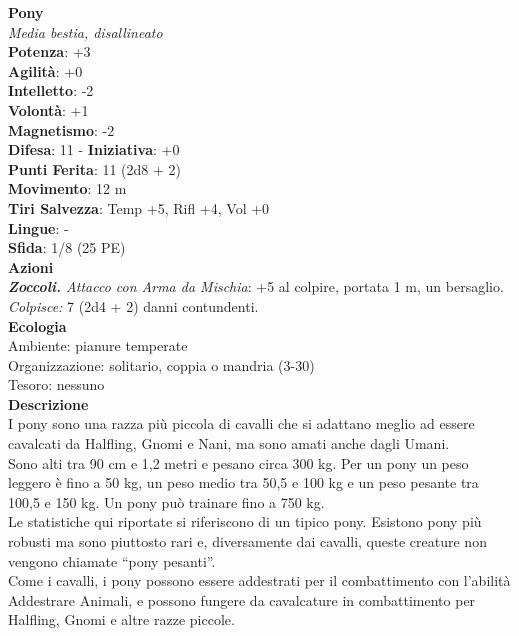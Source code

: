 \begin{multicols}{2}
\medskip\textbf{Pony}\\
\emph{Media bestia, disallineato}\\
\textbf{Potenza}: +3\\
\textbf{Agilità}: +0\\
\textbf{Intelletto}: -2\\
\textbf{Volontà}: +1\\
\textbf{Magnetismo}: -2\\
\textbf{Difesa}: 11 - \textbf{Iniziativa}: +0\\
\textbf{Punti Ferita}: 11 (2d8 + 2)\\
\textbf{Movimento}: 12 m\\
\textbf{Tiri Salvezza}: Temp +5, Rifl +4, Vol +0 \\
\textbf{Lingue}: -\\
\textbf{Sfida}: 1/8 (25 PE)\smallskip\\
\smallskip\textbf{Azioni}\\
\emph{\textbf{Zoccoli.} Attacco con Arma da Mischia}: +5 al colpire, portata 1 m, un bersaglio.\\
\emph{Colpisce:} 7 (2d4 + 2) danni contundenti.\\
\textbf{Ecologia}\\
Ambiente: pianure temperate\\
Organizzazione: solitario, coppia o mandria (3-30)\\
Tesoro: nessuno\\
\textbf{Descrizione}\\

I pony sono una razza più piccola di cavalli che si adattano meglio ad essere cavalcati da Halfling, Gnomi e Nani, ma sono amati anche dagli Umani.\\

Sono alti tra 90 cm e 1,2 metri e pesano circa 300 kg. Per un pony un peso leggero è fino a 50 kg, un peso medio tra 50,5 e 100 kg e un peso pesante tra 100,5 e 150 kg. Un pony può trainare fino a 750 kg.\\

Le statistiche qui riportate si riferiscono di un tipico pony. Esistono pony più robusti  ma sono piuttosto rari e, diversamente dai cavalli, queste creature non vengono chiamate “pony pesanti”.\\

Come i cavalli, i pony possono essere addestrati per il combattimento con l’abilità Addestrare Animali, e possono fungere da cavalcature in combattimento per Halfling, Gnomi e altre razze piccole. \\


\end{multicols}
